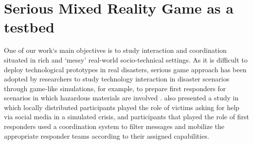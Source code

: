 




\section{Serious Mixed Reality Game as a testbed} \label{sec:SMRG}
One of our work`s main objectives is to study interaction and coordination situated in rich and `messy' real-world socio-technical settings. As it is difficult to deploy technological prototypes in real disasters, serious game approach has been adopted by researchers to study technology interaction in disaster scenarios through game-like simulations, for example, to prepare first responders for scenarios in which hazardous materials are involved \cite{Losh2007}. \cite{Abbasi2012} also presented a study in which locally distributed participants played the role of victims asking for help via social media in a simulated crisis, and participants that played the role of first responders used a coordination system to filter messages and mobilize the appropriate responder teams according to their assigned capabilities.\\

